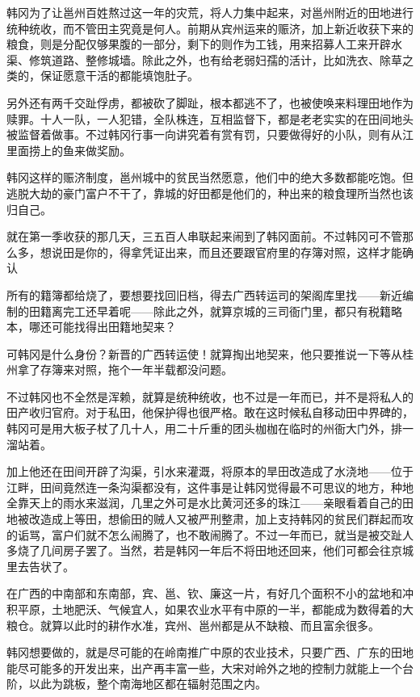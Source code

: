 韩冈为了让邕州百姓熬过这一年的灾荒，将人力集中起来，对邕州附近的田地进行统种统收，而不管田主究竟是何人。前期从宾州运来的赈济，加上新近收获下来的粮食，则是分配仅够果腹的一部分，剩下的则作为工钱，用来招募人工来开辟水渠、修筑道路、整修城墙。除此之外，也有给老弱妇孺的活计，比如洗衣、除草之类的，保证愿意干活的都能填饱肚子。

另外还有两千交趾俘虏，都被砍了脚趾，根本都逃不了，也被使唤来料理田地作为赎罪。十人一队，一人犯错，全队株连，互相监督下，都是老老实实的在田间地头被监督着做事。不过韩冈行事一向讲究着有赏有罚，只要做得好的小队，则有从江里面捞上的鱼来做奖励。

韩冈这样的赈济制度，邕州城中的贫民当然愿意，他们中的绝大多数都能吃饱。但逃脱大劫的豪门富户不干了，靠城的好田都是他们的，种出来的粮食理所当然也该归自己。

就在第一季收获的那几天，三五百人串联起来闹到了韩冈面前。不过韩冈可不管那么多，想说田是你的，得拿凭证出来，而且还要跟官府里的存簿对照，这样才能确认

所有的籍簿都给烧了，要想要找回旧档，得去广西转运司的架阁库里找——新近编制的田籍离完工还早着呢——除此之外，就算京城的三司衙门里，都只有税籍略本，哪还可能找得出田籍地契来？

可韩冈是什么身份？新晋的广西转运使！就算掏出地契来，他只要推说一下等从桂州拿了存簿来对照，拖个一年半载都没问题。

不过韩冈也不全然是浑赖，就算是统种统收，也不过是一年而已，并不是将私人的田产收归官府。对于私田，他保护得也很严格。敢在这时候私自移动田中界碑的，韩冈可是用大板子杖了几十人，用二十斤重的团头枷枷在临时的州衙大门外，排一溜站着。

加上他还在田间开辟了沟渠，引水来灌溉，将原本的旱田改造成了水浇地——位于江畔，田间竟然连一条沟渠都没有，这件事是让韩冈觉得最不可思议的地方，种地全靠天上的雨水来滋润，几里之外可是水比黄河还多的珠江——亲眼看着自己的田地被改造成上等田，想偷田的贼人又被严刑整肃，加上支持韩冈的贫民们群起而攻的诟骂，富户们就不怎么闹腾了，也不敢闹腾了。不过一年而已，就当是被交趾人多烧了几间房子罢了。当然，若是韩冈一年后不将田地还回来，他们可都会往京城里去告状了。

在广西的中南部和东南部，宾、邕、钦、廉这一片，有好几个面积不小的盆地和冲积平原，土地肥沃、气候宜人，如果农业水平有中原的一半，都能成为数得着的大粮仓。就算以此时的耕作水准，宾州、邕州都是从不缺粮、而且富余很多。

韩冈想要做的，就是尽可能的在岭南推广中原的农业技术，只要广西、广东的田地能尽可能多的开发出来，出产再丰富一些，大宋对岭外之地的控制力就能上一个台阶，以此为跳板，整个南海地区都在辐射范围之内。

